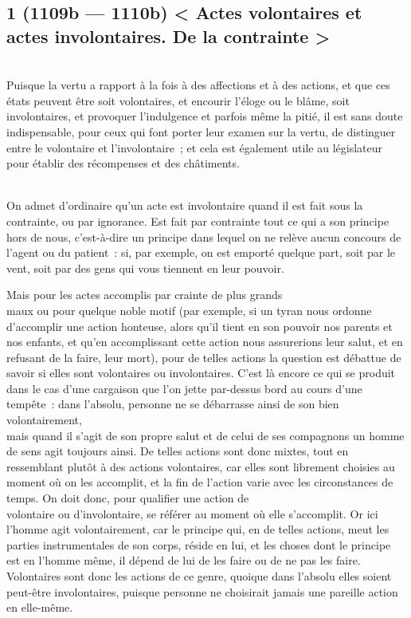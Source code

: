 \documentclass[french,twoside]{book} %
\begin{document}
\subsection[{1 (1109b — 1110b) < Actes volontaires et actes involontaires. De la contrainte >}]{1 (1109b — 1110b) < Actes volontaires et actes involontaires. De la contrainte >}
\noindent \\
Puisque la vertu a rapport à la fois à des affections et à des actions, et que ces états peuvent être soit volontaires, et encourir l’éloge ou le blâme, soit involontaires, et provoquer l’indulgence et parfois même la pitié, il est sans doute indispensable, pour ceux qui font porter leur examen sur la vertu, de distinguer entre le volontaire et l’involontaire ; et cela est également utile au législateur pour établir des récompenses et des châtiments.\par
\\
On admet d’ordinaire qu’un acte est involontaire quand  il est fait sous la contrainte, ou par ignorance. Est fait par contrainte tout ce qui a son principe hors de nous, c’est-à-dire un principe dans lequel on ne relève aucun concours de l’agent ou du patient : si, par exemple, on est emporté quelque part, soit par le vent, soit par des gens qui vous tiennent en leur pouvoir.\par
Mais pour les actes accomplis par crainte de plus grands \\
maux ou pour quelque noble motif (par exemple, si un tyran nous ordonne d’accomplir une action honteuse, alors qu’il tient en son pouvoir nos parents et nos enfants, et qu’en accomplissant cette action nous assurerions leur salut, et en refusant de la faire, leur mort), pour de telles actions la question est débattue de savoir si elles sont volontaires ou involontaires. C’est là encore ce qui se produit dans le cas d’une cargaison que l’on jette par-dessus bord au cours d’une tempête : dans l’absolu, personne ne se débarrasse ainsi de son bien volontairement, \\
mais quand il s’agit de son propre salut et de celui de ses compagnons un homme de sens agit toujours ainsi. De telles actions sont donc mixtes, tout en ressemblant plutôt à des actions volontaires, car elles sont librement choisies au moment où on les accomplit, et la fin de l’action varie avec les circonstances de temps. On doit donc, pour qualifier une action de \\
volontaire ou d’involontaire, se référer au moment où elle s’accomplit. Or ici l’homme agit volontairement, car le principe qui, en de telles actions, meut les parties instrumentales de son corps, réside en lui, et les choses dont le principe est en l’homme même, il dépend de lui de les faire ou de ne pas les faire. Volontaires sont donc les actions de ce genre, quoique dans l’absolu elles soient peut-être involontaires, puisque personne ne choisirait jamais une pareille action en elle-même.\par
\end{document}
